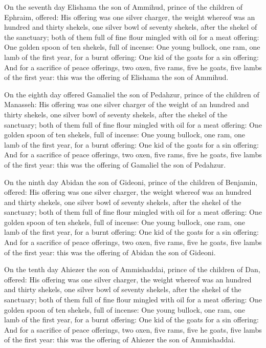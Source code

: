  On the seventh day Elishama the son of Ammihud, prince of
the children of Ephraim, offered:  His offering was one
silver charger, the weight whereof was an hundred and thirty shekels,
one silver bowl of seventy shekels, after the shekel of the sanctuary;
both of them full of fine flour mingled with oil for a meat offering:
 One golden spoon of ten shekels, full of incense:
 One young bullock, one ram, one lamb of the first year,
for a burnt offering:  One kid of the goats for a sin
offering:  And for a sacrifice of peace offerings, two
oxen, five rams, five he goats, five lambs of the first year: this was
the offering of Elishama the son of Ammihud.

 On the eighth day offered Gamaliel the son of Pedahzur,
prince of the children of Manasseh:  His offering was one
silver charger of the weight of an hundred and thirty shekels, one
silver bowl of seventy shekels, after the shekel of the sanctuary; both
of them full of fine flour mingled with oil for a meat offering:
 One golden spoon of ten shekels, full of incense:
 One young bullock, one ram, one lamb of the first year,
for a burnt offering:  One kid of the goats for a sin
offering:  And for a sacrifice of peace offerings, two
oxen, five rams, five he goats, five lambs of the first year: this was
the offering of Gamaliel the son of Pedahzur.

 On the ninth day Abidan the son of Gideoni, prince of the
children of Benjamin, offered:  His offering was one silver
charger, the weight whereof was an hundred and thirty shekels, one
silver bowl of seventy shekels, after the shekel of the sanctuary; both
of them full of fine flour mingled with oil for a meat offering:
 One golden spoon of ten shekels, full of incense:
 One young bullock, one ram, one lamb of the first year,
for a burnt offering:  One kid of the goats for a sin
offering:  And for a sacrifice of peace offerings, two
oxen, five rams, five he goats, five lambs of the first year: this was
the offering of Abidan the son of Gideoni.

 On the tenth day Ahiezer the son of Ammishaddai, prince of
the children of Dan, offered:  His offering was one silver
charger, the weight whereof was an hundred and thirty shekels, one
silver bowl of seventy shekels, after the shekel of the sanctuary; both
of them full of fine flour mingled with oil for a meat offering:
 One golden spoon of ten shekels, full of incense:
 One young bullock, one ram, one lamb of the first year,
for a burnt offering:  One kid of the goats for a sin
offering:  And for a sacrifice of peace offerings, two
oxen, five rams, five he goats, five lambs of the first year: this was
the offering of Ahiezer the son of Ammishaddai.

